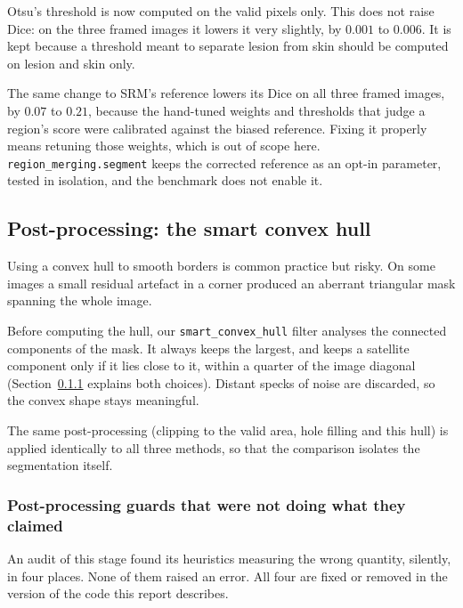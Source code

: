 \documentclass[11pt,a4paper]{article}
\begin{document}
Otsu's threshold is now computed on the valid pixels only. This does not raise
Dice: on the three framed images it lowers it very slightly, by $0.001$ to
$0.006$. It is kept because a threshold meant to separate lesion from skin
should be computed on lesion and skin only.

The same change to SRM's reference lowers its Dice on all three framed
images, by $0.07$ to $0.21$, because the hand-tuned weights and thresholds
that judge a region's score were calibrated against the biased reference.
Fixing it properly means retuning those weights, which is out of scope here.
\texttt{region\_merging.segment} keeps the corrected reference as an opt-in
parameter, tested in isolation, and the benchmark does not enable it.

\subsection{Post-processing: the smart convex hull}

Using a convex hull to smooth borders is common practice but risky. On some
images a small residual artefact in a corner produced an aberrant triangular
mask spanning the whole image.

Before computing the hull, our \texttt{smart\_convex\_hull} filter analyses the
connected components of the mask. It always keeps the largest, and keeps a
satellite component only if it lies close to it, within a quarter of the
image diagonal (Section~\ref{sec:four-guards} explains both choices). Distant
specks of noise are discarded, so the convex shape stays meaningful.

The same post-processing (clipping to the valid area, hole filling and this
hull) is applied identically to all three methods, so that the comparison
isolates the segmentation itself.

\subsubsection{Post-processing guards that were not doing what they claimed}
\label{sec:four-guards}

An audit of this stage found its heuristics measuring the wrong quantity,
silently, in four places. None of them raised an error. All four are fixed or
removed in the version of the code this report describes.
\end{document}
